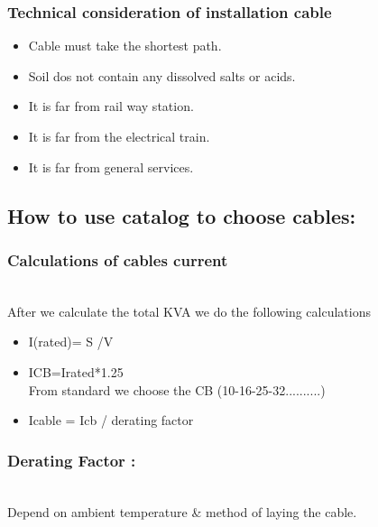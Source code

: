 \documentclass[12pt,fleqn]{book} %
\begin{document}
\subsubsection{Technical consideration of installation cable}
     \begin{itemize}
    \item 	Cable must take the shortest path.
    \item Soil dos not contain any dissolved salts or acids.
    \item	It is far from rail way station.
    \item It is far from the electrical train.
    \item It is far from general services.
\end{itemize}
\subsection{  How to use catalog to choose cables:}
\subsubsection {Calculations of cables current}
\\After we calculate the total KVA we do the following calculations
\begin{itemize}
    \item 	I(rated)= S /V
    \item 	ICB=Irated*1.25
   \\ From standard we choose the CB (10-16-25-32..........) 
    \item	Icable = Icb / derating factor
    \end{itemize}
\subsubsection{  Derating Factor :}
    \\Depend on ambient temperature & method of laying the cable.
\end{document}
